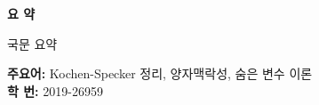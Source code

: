 \newpage

\thispagestyle{plain}
\begin{center}
    \Large
    \textbf{요 약}
\end{center}

국문 요약


\textbf{주요어:} Kochen-Specker 정리, 양자맥락성, 숨은 변수 이론\\

\textbf{학 번:} 2019-26959
